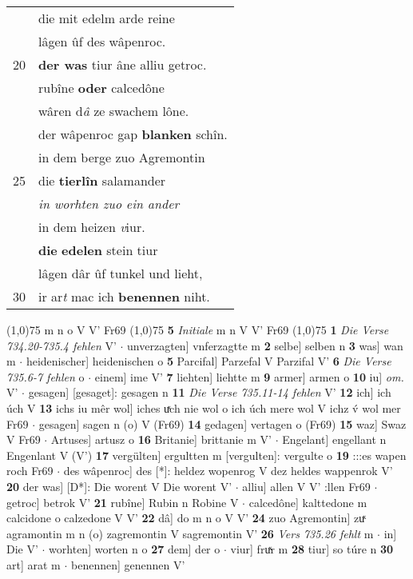 \documentclass[8pt,a4paper,notitlepage]{article}
\begin{document}
\begin{table}[ht]
\begin{minipage}[t]{0.5\linewidth}
\begin{tabular}{rl}
 & die mit edelm arde reine\\ 
 & lâgen ûf des wâpenroc.\\ 
20 & \textbf{der was} tiur âne alliu getroc.\\ 
 & rubîne \textbf{oder} calcedône\\ 
 & wâren d\textit{â} ze swachem lône.\\ 
 & der wâpenroc gap \textbf{blanken} schîn.\\ 
 & in dem berge zuo Agremontin\\ 
25 & die \textbf{tierlîn} salamander\\ 
 & \textit{in worhten zuo ein ander}\\ 
 & in dem heizen \textit{v}iur.\\ 
 & \textbf{die} \textbf{edelen} stein tiur\\ 
 & lâgen dâr ûf tunkel und lieht,\\ 
30 & ir ar\textit{t} mac ich \textbf{benennen} niht.\\ 
\end{tabular}
\scriptsize
\line(1,0){75} \newline
m n o V V' Fr69 \newline
\line(1,0){75} \newline
\textbf{5} \textit{Initiale} m n V V' Fr69  \newline
\line(1,0){75} \newline
\textbf{1} \textit{Die Verse 734.20-735.4 fehlen} V'   $\cdot$ unverzagten] vnferzagtte m \textbf{2} selbe] selben n \textbf{3} was] wan m  $\cdot$ heidenischer] heidenischen o \textbf{5} Parcifal] Parzefal V Parzifal V' \textbf{6} \textit{Die Verse 735.6-7 fehlen } o   $\cdot$ einem] ime V' \textbf{7} liehten] liehtte m \textbf{9} armer] armen o \textbf{10} iu] \textit{om.} V'  $\cdot$ gesagen] [gesaget]: gesagen n \textbf{11} \textit{Die Verse 735.11-14 fehlen} V'  \textbf{12} ich] ich úch V \textbf{13} ichs iu mêr wol] iches uͯch nie wol o ich úch mere wol V ichz v́ wol mer Fr69  $\cdot$ gesagen] sagen n (o) V (Fr69) \textbf{14} gedagen] vertagen o (Fr69) \textbf{15} waz] Swaz V Fr69  $\cdot$ Artuses] artusz o \textbf{16} Britanie] brittanie m V'  $\cdot$ Engelant] engellant n Engenlant V (V') \textbf{17} vergülten] ergultten m [vergulten]: vergulte o \textbf{19} :::es wapen roch Fr69  $\cdot$ des wâpenroc] des [*]: heldez wopenrog V dez heldes wappenrok V' \textbf{20} der was] [D*]: Die worent V Die worent V'  $\cdot$ alliu] allen V V' :llen Fr69  $\cdot$ getroc] betrok V' \textbf{21} rubîne] Rubin n Robine V  $\cdot$ calcedône] kalttedone m calcidone o calzedone V V' \textbf{22} dâ] do m n o V V' \textbf{24} zuo Agremontin] zuͯ agramontin m n (o) zagremontin V sagremontin V' \textbf{26} \textit{Vers 735.26 fehlt} m   $\cdot$ in] Die V'  $\cdot$ worhten] worten n o \textbf{27} dem] der o  $\cdot$ viur] fruͯr m \textbf{28} tiur] so túre n \textbf{30} art] arat m  $\cdot$ benennen] genennen V' \newline
\end{minipage}
\end{table}
\end{document}
